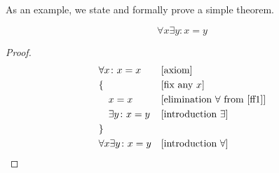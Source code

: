 As an example, we state and formally prove a simple theorem.

\begin{theorem}
  \[ \forall x \exists y\colon x=y \]
\end{theorem}
\begin{proof}
  \begin{align}
    &\forall x\colon x = x & & \text{[axiom]} \label{ff1}\\
    &\{ & &\text{[fix any $x$]}\\
    &\quad x=x  & & \text{[elimination $\forall$ from \eqref{ff1}]}\\ 
    &\quad \exists y\colon x=y & &\text{[introduction $\exists$]}\\
    &\} & &\\
    &\forall x\exists y\colon x=y & &\text{[introduction $\forall$]} 
  \end{align}
\end{proof}